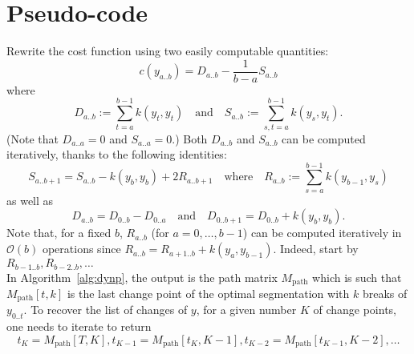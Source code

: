 \documentclass[12pt]{article}
\begin{document}
\section{Pseudo-code}
Rewrite the cost function using two easily computable quantities:
\begin{equation}
    c(y_{a..b}) = D_{a..b} - \frac{1}{b-a} S_{a..b}
\end{equation}
where
\begin{equation}
    D_{a..b} := \sum_{t=a}^{b-1} k(y_t, y_t) \quad\text{and}\quad S_{a..b} := \sum_{s,t=a}^{b-1} k(y_s,y_t).
\end{equation}
(Note that $D_{a..a}=0$ and $S_{a..a}=0$.)
Both $D_{a..b}$ and $S_{a..b}$ can be computed iteratively, thanks to the following identities:
\begin{equation}
    S_{a..b+1} = S_{a..b} -k(y_b, y_{b}) + 2 R_{a..b+1} \quad\text{where}\quad R_{a..b} :=\sum_{s=a}^{b-1} k(y_{b-1}, y_s)
\end{equation}
as well as
\begin{equation}
    D_{a..b} = D_{0..b} - D_{0..a}\quad\text{and}\quad D_{0..b+1} = D_{0..b} + k(y_b, y_b).
\end{equation}
Note that, for a fixed $b$, $R_{a..b}$ (for $a=0,\dots,b-1$) can be computed iteratively in $\mathcal{O}(b)$ operations since $R_{a..b} = R_{a+1..b} + k(y_a, y_{b-1})$.
Indeed, start by $R_{b-1..b}, R_{b-2..b},\dots$
\\
In Algorithm~\ref{alg:dynp}, the output is the path matrix $M_{\text{path}}$ which is such that $M_{\text{path}}[t, k]$ is the last change point of the optimal segmentation with $k$ breaks of $y_{0..t}$.
To recover the list of changes of $y$, for a given number $K$ of change points, one needs to iterate to return
\begin{equation*}
    t_K = M_{\text{path}}[T, K], t_{K-1}=M_{\text{path}}[t_K, K-1], t_{K-2}=M_{\text{path}}[t_{K-1}, K-2], \dots  
\end{equation*}
\end{document}

